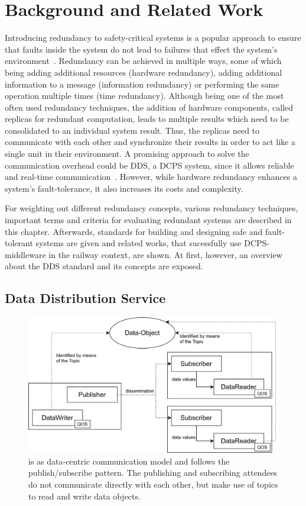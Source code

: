 \chapter{Background and Related Work}
\label{chptr:concepts}

Introducing redundancy to safety-critical systems is a popular approach to ensure that faults inside the system do not lead to failures that effect the system's environment~\cite{BarryFaultToleranceAnalysis}.
Redundancy can be achieved in multiple ways, some of which being adding additional resources (hardware redundancy), adding additional information to a message (information redundancy) or performing the same operation multiple times (time redundancy).
Although being one of the most often used redundancy techniques, the addition of hardware components, called replicas for redundant computation, leads to multiple results which need to be consolidated to an individual system result.
Thus, the replicas need to communicate with each other and synchronize their results in order to act like a single unit in their environment.
A promising approach to solve the communication overhead could be \gls*{DDS}, a \gls*{DCPS} system, since it allows reliable and real-time communication~\cite{omgDDSspec}.
However, while hardware redundancy enhances a system's fault-tolerance, it also increases its costs and complexity.

For weighting out different redundancy concepts, various redundancy techniques, important terms and criteria for evaluating redundant systems are described in this chapter.
Afterwards, standards for building and designing safe and fault-tolerant systems are given and related works, that sucessfully use \gls*{DCPS}-middleware in the railway context, are shown.
At first, however, an overview about the \gls*{DDS} standard and its concepts are exposed.

\section{Data Distribution Service}

\begin{figure}[!hb]
	\centering
	\includegraphics[width=0.75\linewidth]{images/DDSStructure}
	\caption{ is as data-centric communication model and follows the publish/subscribe pattern. The publishing and subscribing attendees do not communicate directly with each other, but make use of topics to read and write data objects.}
	\label{fig:DDSStructure}
\end{figure}

